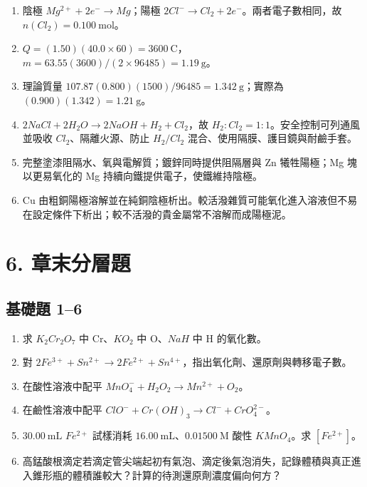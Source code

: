 \documentclass[11pt,a4paper]{article}
\providecommand{\tightlist}{%
  \setlength{\itemsep}{0pt}\setlength{\parskip}{0pt}}
\begin{document}
\begin{enumerate}
\def\labelenumi{\arabic{enumi}.}
\tightlist
\item
  陰極 \(Mg^{2+}+2e^-\rightarrow Mg\)；陽極 \(2Cl^-\rightarrow Cl_2+2e^-\)。兩者電子數相同，故 \(n(Cl_2)=0.100\ \mathrm{mol}\)。
\item
  \(Q=(1.50)(40.0\times60)=3600\ \mathrm C\)，\(m=63.55(3600)/(2\times96485)=1.19\ \mathrm g\)。
\item
  理論質量 \(107.87(0.800)(1500)/96485=1.342\ \mathrm g\)；實際為 \((0.900)(1.342)=1.21\ \mathrm g\)。
\item
  \(2NaCl+2H_2O\rightarrow2NaOH+H_2+Cl_2\)，故 \(H_2:Cl_2=1:1\)。安全控制可列通風並吸收 \(Cl_2\)、隔離火源、防止 \(H_2/Cl_2\) 混合、使用隔膜、護目鏡與耐鹼手套。
\item
  完整塗漆阻隔水、氧與電解質；鍍鋅同時提供阻隔層與 Zn 犧牲陽極；Mg 塊以更易氧化的 Mg 持續向鐵提供電子，使鐵維持陰極。
\item
  Cu 由粗銅陽極溶解並在純銅陰極析出。較活潑雜質可能氧化進入溶液但不易在設定條件下析出；較不活潑的貴金屬常不溶解而成陽極泥。
\end{enumerate}

\section{6. 章末分層題}\label{ux7ae0ux672bux5206ux5c64ux984c}

\subsection{基礎題 1--6}\label{ux57faux790eux984c-16}

\begin{enumerate}
\def\labelenumi{\arabic{enumi}.}
\tightlist
\item
  求 \(K_2Cr_2O_7\) 中 Cr、\(KO_2\) 中 O、\(NaH\) 中 H 的氧化數。
\item
  對 \(2Fe^{3+}+Sn^{2+}\rightarrow2Fe^{2+}+Sn^{4+}\)，指出氧化劑、還原劑與轉移電子數。
\item
  在酸性溶液中配平 \(MnO_4^-+H_2O_2\rightarrow Mn^{2+}+O_2\)。
\item
  在鹼性溶液中配平 \(ClO^-+Cr(OH)_3\rightarrow Cl^-+CrO_4^{2-}\)。
\item
  \(30.00\ \mathrm{mL}\) \(Fe^{2+}\) 試樣消耗 \(16.00\ \mathrm{mL}\)、\(0.01500\ \mathrm M\) 酸性 \(KMnO_4\)。求 \([Fe^{2+}]\)。
\item
  高錳酸根滴定若滴定管尖端起初有氣泡、滴定後氣泡消失，記錄體積與真正進入錐形瓶的體積誰較大？計算的待測還原劑濃度偏向何方？
\end{enumerate}
\end{document}
